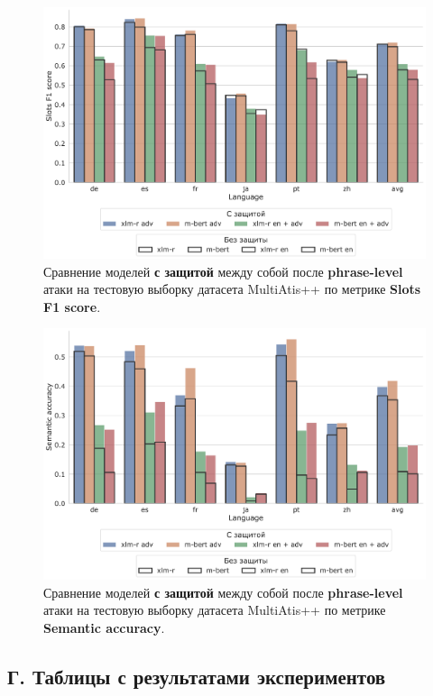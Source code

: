 \begin{figure}[H]
    \centering
    \includegraphics[width=\textwidth]{images/16}
    \caption{Сравнение моделей \textbf{с защитой} между собой после \textbf{phrase-level} атаки на тестовую выборку датасета MultiAtis++ по метрике \textbf{Slots F1 score}.}\label{fig:figure16}
\end{figure}
\begin{figure}[H]
    \centering
    \includegraphics[width=\textwidth]{images/17}
    \caption{Сравнение моделей \textbf{с защитой} между собой после \textbf{phrase-level} атаки на тестовую выборку датасета MultiAtis++ по метрике \textbf{Semantic accuracy}.}\label{fig:figure17}
\end{figure}

\newpage

\subsection*{Г. Таблицы с результатами экспериментов}







